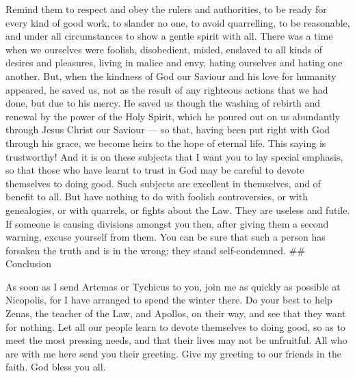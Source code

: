  Remind them to respect and obey the rulers and authorities,
to be ready for every kind of good work, to slander no one, to avoid
quarrelling,  to be reasonable, and under all circumstances
to show a gentle spirit with all.  There was a time when we
ourselves were foolish, disobedient, misled, enslaved to all kinds of
desires and pleasures, living in malice and envy, hating ourselves and
hating one another.  But, when the kindness of God our
Saviour and his love for humanity appeared, he saved us, 
not as the result of any righteous actions that we had done, but due to
his mercy. He saved us though the washing of rebirth and renewal by the
power of the Holy Spirit,  which he poured out on us
abundantly through Jesus Christ our Saviour ---  so that,
having been put right with God through his grace, we become heirs to the
hope of eternal life.  This saying is trustworthy! And it is
on these subjects that I want you to lay special emphasis, so that those
who have learnt to trust in God may be careful to devote themselves to
doing good. Such subjects are excellent in themselves, and of benefit to
all.  But have nothing to do with foolish controversies, or
with genealogies, or with quarrels, or fights about the Law. They are
useless and futile.  If someone is causing divisions
amongst you then, after giving them a second warning, excuse yourself
from them.  You can be sure that such a person has forsaken
the truth and is in the wrong; they stand self-condemned. \#\#
Conclusion

 As soon as I send Artemas or Tychicus to you, join me as
quickly as possible at Nicopolis, for I have arranged to spend the
winter there.  Do your best to help Zenas, the teacher of
the Law, and Apollos, on their way, and see that they want for nothing.
 Let all our people learn to devote themselves to doing
good, so as to meet the most pressing needs, and that their lives may
not be unfruitful.  All who are with me here send you their
greeting. Give my greeting to our friends in the faith. God bless you
all.
